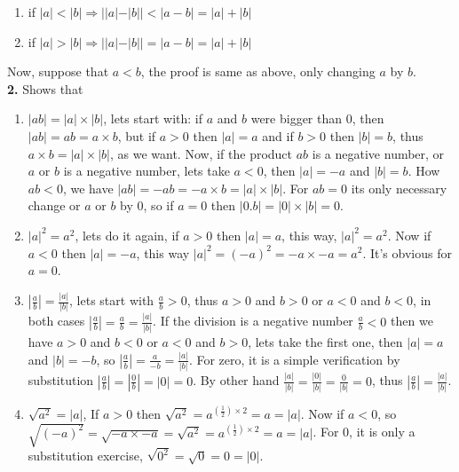 \documentclass{amsart}
\begin{document}
\begin{enumerate}
\begin{center}
\begin{enumerate}
    \item if $|a|<|b| \Rightarrow ||a|-|b||<|a-b|=|a|+|b|$
    \item if $|a|>|b| \Rightarrow ||a|-|b||=|a-b|=|a|+|b|$
\end{enumerate}
\end{center}
\end{enumerate}
Now, suppose that $a<b$, the proof is same as above, only changing $a$ by $b$.\\

\textbf{2.} Shows that
    \begin{enumerate}
        \item $|ab|=|a|\times|b|$, lets start with: if $a$ and $b$ were bigger than $0$, then $|ab|=ab=a\times b$, but if $a>0$ then $|a|=a$ and if $b>0$ then $|b|=b$, thus $a\times b=|a|\times|b|$, as we want. Now, if the product $ab$ is a negative number, or $a$ or $b$ is a negative number, lets take $a<0$, then $|a|=-a$ and $|b|=b$. How $ab<0$, we have $|ab|=-ab=-a\times b=|a|\times|b|$. For $ab=0$ its only necessary change or $a$ or $b$ by $0$, so if $a=0$ then $|0.b|=|0|\times|b|=0$.
        \item $|a|^2=a^2$, lets do it again, if $a>0$ then $|a|=a$, this way, $|a|^2=a^2$. Now if $a<0$ then $|a|=-a$, this way $|a|^2=(-a)^2=-a\times-a=a^2$. It's obvious for $a=0$.
        \item $|\frac{a}{b}|=\frac{|a|}{|b|}$, lets start with $\frac{a}{b}>0$, thus $a>0$ and $b>0$ or $a<0$ and $b<0$, in both cases $|\frac{a}{b}|=\frac{a}{b}=\frac{|a|}{|b|}$. If the division is a negative number $\frac{a}{b}<0$ then we have $a>0$ and $b<0$ or $a<0$ and $b>0$, lets take the first one, then $|a|=a$ and $|b|=-b$, so $|\frac{a}{b}|=\frac{a}{-b}=\frac{|a|}{|b|}$. For zero, it is a simple verification by substitution $|\frac{a}{b}|=|\frac{0}{b}|=|0|=0$. By other hand $\frac{|a|}{|b|}=\frac{|0|}{|b|}=\frac{0}{|b|}=0$, thus $|\frac{a}{b}|=\frac{|a|}{|b|}$.
        \item $\sqrt{a^2}=|a|$, If $a>0$ then $\sqrt{a^2}=a^{(\frac{1}{2})\times2}=a=|a|$. Now if $a<0$, so $\sqrt{(-a)^2}=\sqrt{-a\times-a}=\sqrt{a^2}=a^{(\frac{1}{2})\times2}=a=|a|$. For 0, it is only a substitution exercise, $\sqrt{0^2}=\sqrt{0}=0=|0|$.
    \end{enumerate}
    
\end{document}

